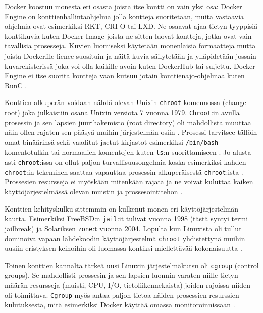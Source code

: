 \documentclass[finnish,gradu]{tktltiki3}
\begin{document}
Docker koostuu monesta eri osasta joista itse kontti on vain yksi osa: Docker Engine on konttienhallintaohjelma jolla kontteja suoritetaan, muita vastaavia ohjelmia ovat esimerkiksi RKT, CRI-O tai LXD. Ne osaavat ajaa tietyn tyyppisiä konttikuvia kuten Docker Image joista ne sitten luovat kontteja, jotka ovat vain tavallisia prosesseja. Kuvien luomiseksi käytetään monenlaisia formaatteja mutta joista Dockerfile lienee suosituin ja näitä kuvia säilytetään ja ylläpidetään jossain kuvarekisterissä joka voi olla kaikille avoin kuten DockerHub tai suljettu. Docker Engine ei itse suorita kontteja vaan kutsuu jotain konttienajo-ohjelmaa kuten RunC \cite{practical-container}.

Konttien alkuperän voidaan nähdä olevan Unixin \texttt{chroot}-komennossa (change root) joka julkaistiin osana Unixin versiota 7 vuonna 1979. \texttt{Chroot}:in avulla prosessin ja sen lapsien juurihakemisto (root directory) oli mahdollista muuttaa näin ollen rajaten sen pääsyä muihin järjestelmän osiin \cite{containers-in-multi-user-environments}. Prosessi tarvitsee tällöin omat binäärinsä sekä vaaditut jaetut kirjastot esimerkiksi \texttt{/bin/bash} -komentotulkin tai normaalien komentojen kuten \texttt{ls}:n suorittamiseen \cite{oracle-docs-chroot}. Jo alusta asti \texttt{chroot}:issa on ollut paljon turvallisuusongelmia koska esimerkiksi kahden \texttt{chroot}:in tekeminen saattaa vapauttaa prosessin alkuperäisestä \texttt{chroot}:ista \cite{chroot-paper}. Prossesien resursseja ei myöskään mitenkään rajata ja ne voivat kuluttaa kaiken käyttöjärjestelmässä olevan muistin ja prossesointitehon \cite{chroot-blog}.

Konttien kehityskulku sittemmin on kulkenut monen eri käyttöjärjestelmän kautta. Esimerkiksi FreeBSD:n \texttt{jail}:it tulivat vuonna 1998 (tästä syntyi termi jailbreak) ja Solariksen \texttt{zone}:t vuonna 2004. Lopulta kun Linuxista oli tullut dominoiva vapaan lähdekoodin käyttöjärjestelmä \texttt{chroot} yhdistettynä muihin uusiin eristyksen keinoihin oli luomassa kontiksi miellettävää kokonaisuutta \cite{lxc-docker-kubernetes}.

Toinen konttien kannalta tärkeä uusi Linuxin järjestelmäkutsu oli \texttt{cgroup} (control groups). Se mahdollisti prossesin ja sen lapsien luonnin varaten niille tietyn määrän resursseja (muisti, CPU, I/O, tietoliikennekaista) joiden rajoissa niiden oli toimittava. \texttt{Cgroup} myös antaa paljon tietoa näiden prosessien resurssien kulutuksesta, mitä esimerkiksi Docker käyttää omassa monitoroinnissaan \cite{docker}.
\end{document}
